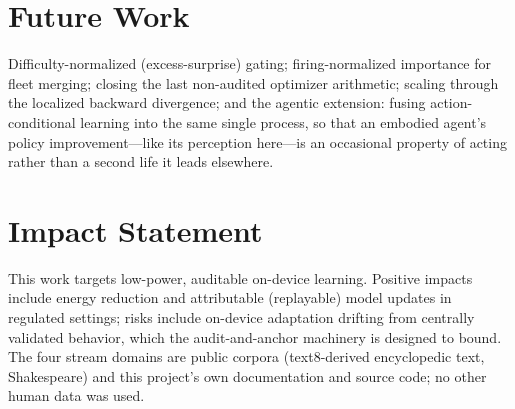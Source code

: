 \documentclass{article}
\begin{document}
\section{Future Work}
\label{sec:future}
Difficulty-normalized (excess-surprise) gating; firing-normalized importance
for fleet merging; closing the last non-audited optimizer arithmetic;
scaling through the localized backward divergence; and the agentic
extension: fusing action-conditional learning into the same single process,
so that an embodied agent's policy improvement---like its perception
here---is an occasional property of acting rather than a second life it
leads elsewhere.

\section*{Impact Statement}
This work targets low-power, auditable on-device learning. Positive impacts
include energy reduction and attributable (replayable) model updates in
regulated settings; risks include on-device adaptation drifting from
centrally validated behavior, which the audit-and-anchor machinery is
designed to bound. The four stream domains are public corpora (text8-derived encyclopedic
text, Shakespeare) and this project's own documentation and source code; no
other human data was used.



\end{document}
